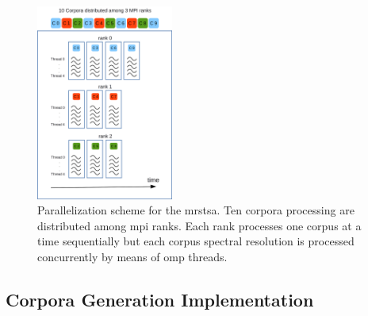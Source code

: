 \documentclass[11pt,a4paper]{article}
\begin{document}
\begin{figure}[h!]
    \centering
    \includegraphics[width=0.4\textwidth]{MRSTSA_Parallelization.png}
    \caption{Parallelization scheme for the \gls{mrstsa}. Ten corpora processing are distributed among \gls{mpi} ranks. Each rank processes one corpus at a time sequentially but each corpus spectral resolution is processed concurrently by means of \gls{omp} threads.}
    \label{fig:MRSTSA_Parallelization}
\end{figure}











































\subsection{Corpora Generation Implementation}
\label{CorpGenImp}

\end{document}
